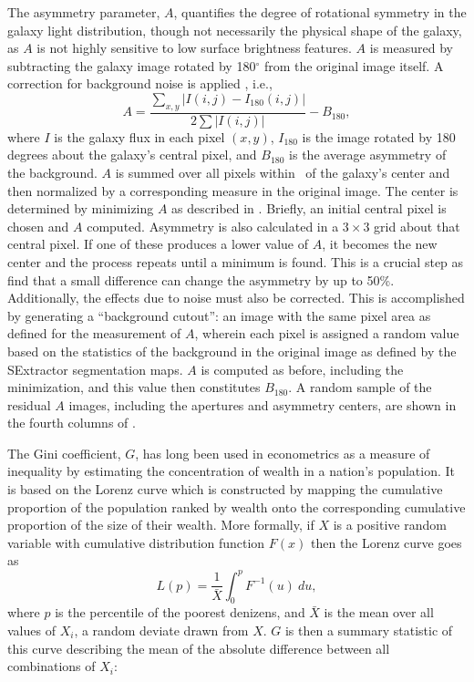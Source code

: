 The asymmetry parameter, $A$, quantifies the degree of rotational symmetry in the galaxy light distribution, though not necessarily the physical shape of the galaxy, as $A$ is not highly sensitive to low surface brightness features. $A$ is measured by subtracting the galaxy image rotated by 180$^{\circ}$ from the original image itself. A correction for background noise is applied \citep[as in e.g.,][]{Conselice2000, Lotz2004}, i.e., 
\begin{equation}\label{eqn: asymmetry}
A = \frac{\sum_{x,y} |I(i,j) - I_{180}(i,j)|}{ 2\sum|I(i,j)|} - B_{180},
\end{equation}
where $I$ is the galaxy flux in each pixel $(x, y)$, $I_{180}$ is the image rotated by 180 degrees about the galaxy's central pixel, and $B_{180}$ is the average asymmetry of the background. $A$ is summed over all pixels within \rp~of the galaxy's center and then normalized by a corresponding measure in the original image. The center is determined by minimizing $A$ as described in \cite{Conselice2000}. Briefly, an initial central pixel is chosen and $A$ computed. Asymmetry is also calculated in a $3\times3$ grid about that central pixel. If one of these produces a lower value of $A$, it becomes the new center and the process repeats until a minimum is found. This is a crucial step as \cite{Conselice2000} find that a small difference can change the asymmetry by up to 50\%. Additionally, the effects due to noise must also be corrected. This is accomplished by generating a ``background cutout'': an image with the same pixel area as defined for the measurement of $A$, wherein each pixel is assigned a random value based on the statistics of the background in the original image as defined by the SExtractor segmentation maps. $A$ is computed as before, including the minimization, and this value then constitutes $B_{180}$. A random sample of the residual $A$ images, including the apertures and asymmetry centers, are shown in the fourth columns of . 

The Gini coefficient, $G$, has long been used in econometrics as a measure of inequality by estimating the concentration of wealth in a nation's population. It is based on the Lorenz curve \citep{Lorenz1905} which is constructed by mapping the cumulative proportion of the population ranked by wealth onto the corresponding cumulative proportion of the size of their wealth. More formally, if $X$ is a positive random variable with cumulative distribution function $F(x)$ then the Lorenz curve goes as   
\begin{equation}
L(p) = \frac{1}{\bar X}\int^p_0 F^{-1}(u)~du,
\end{equation}
where $p$ is the percentile of the poorest denizens, and $\bar X$ is the mean over all values of $X_i$, a random deviate drawn from $X$. $G$ is then a summary statistic of this curve describing the mean of the absolute difference between all combinations of $X_i$:

